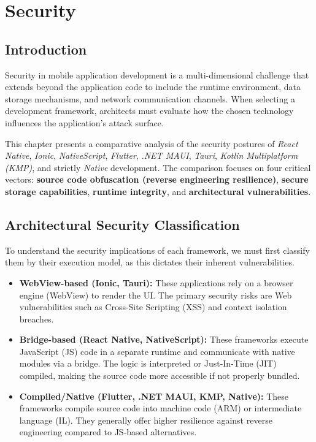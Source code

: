 \chapter{Security}
\label{chap:security}

\section{Introduction}
Security in mobile application development is a multi-dimensional challenge that extends beyond the application code to include the runtime environment, data storage mechanisms, and network communication channels. When selecting a development framework, architects must evaluate how the chosen technology influences the application's attack surface.

This chapter presents a comparative analysis of the security postures of \textit{React Native}, \textit{Ionic}, \textit{NativeScript}, \textit{Flutter}, \textit{.NET MAUI}, \textit{Tauri}, \textit{Kotlin Multiplatform (KMP)}, and strictly \textit{Native} development. The comparison focuses on four critical vectors: \textbf{source code obfuscation (reverse engineering resilience)}, \textbf{secure storage capabilities}, \textbf{runtime integrity}, and \textbf{architectural vulnerabilities}.

\section{Architectural Security Classification}
To understand the security implications of each framework, we must first classify them by their execution model, as this dictates their inherent vulnerabilities.

\begin{itemize}
    \item \textbf{WebView-based (Ionic, Tauri):} These applications rely on a browser engine (WebView) to render the UI. The primary security risks are Web vulnerabilities such as Cross-Site Scripting (XSS) and context isolation breaches.
    \item \textbf{Bridge-based (React Native, NativeScript):} These frameworks execute JavaScript (JS) code in a separate runtime and communicate with native modules via a bridge. The logic is interpreted or Just-In-Time (JIT) compiled, making the source code more accessible if not properly bundled.
    \item \textbf{Compiled/Native (Flutter, .NET MAUI, KMP, Native):} These frameworks compile source code into machine code (ARM) or intermediate language (IL). They generally offer higher resilience against reverse engineering compared to JS-based alternatives.
\end{itemize}

